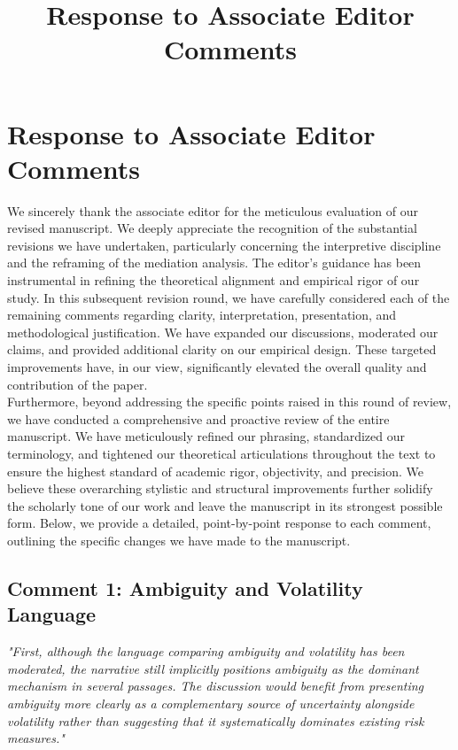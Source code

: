 \documentclass[12pt]{article}
\title{Response to Associate Editor Comments}
\author{}
\date{}
\begin{document}
\maketitle

\section*{Response to Associate Editor Comments}

We sincerely thank the associate editor for the meticulous evaluation of our revised manuscript. We deeply appreciate the recognition of the substantial revisions we have undertaken, particularly concerning the interpretive discipline and the reframing of the mediation analysis. The editor's guidance has been instrumental in refining the theoretical alignment and empirical rigor of our study. In this subsequent revision round, we have carefully considered each of the remaining comments regarding clarity, interpretation, presentation, and methodological justification. We have expanded our discussions, moderated our claims, and provided additional clarity on our empirical design. These targeted improvements have, in our view, significantly elevated the overall quality and contribution of the paper. \\

\noindent Furthermore, beyond addressing the specific points raised in this round of review, we have conducted a comprehensive and proactive review of the entire manuscript. We have meticulously refined our phrasing, standardized our terminology, and tightened our theoretical articulations throughout the text to ensure the highest standard of academic rigor, objectivity, and precision. We believe these overarching stylistic and structural improvements further solidify the scholarly tone of our work and leave the manuscript in its strongest possible form. Below, we provide a detailed, point-by-point response to each comment, outlining the specific changes we have made to the manuscript.

\subsection*{Comment 1: Ambiguity and Volatility Language}
\textit{"First, although the language comparing ambiguity and volatility has been moderated, the narrative still implicitly positions ambiguity as the dominant mechanism in several passages. The discussion would benefit from presenting ambiguity more clearly as a complementary source of uncertainty alongside volatility rather than suggesting that it systematically dominates existing risk measures."}
\end{document}
